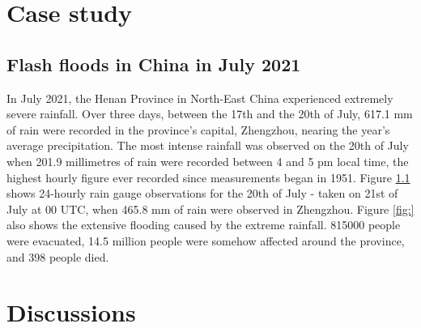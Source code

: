 \begin{figure}[htbp]
\label{fig:verif_breakdown_scores_reliability_diagram}
\end{figure}


\section{Case study}
\label{regional_to_global_training_case_study}

\subsection{Flash floods in China in July 2021}

In July 2021, the Henan Province in North-East China experienced extremely severe rainfall. Over three days, between the 17th and the 20th of July, 617.1 mm of rain were recorded in the province's capital, Zhengzhou, nearing the year's average precipitation. The most intense rainfall was observed on the 20th of July when 201.9 millimetres of rain were recorded between 4 and 5 pm local time, the highest hourly figure ever recorded since measurements began in 1951. Figure \ref{} shows 24-hourly rain gauge observations for the 20th of July - taken on 21st of July at 00 UTC, when 465.8 mm of rain were observed in Zhengzhou. Figure \ref{fig:} also shows the extensive flooding caused by the extreme rainfall. 815000 people were evacuated, 14.5 million people were somehow affected around the province, and 398 people died.  
























\section{Discussions}
\label{regional_to_global_training_discussions}

